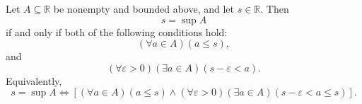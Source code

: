 \begin{definition}
\label{def:epsilon-characterization-of-supremum}
Let $A\subseteq\mathbb{R}$ be nonempty and bounded above, and let
$s\in\mathbb{R}$. Then
\[
  s=\sup A
\]
if and only if both of the following conditions hold:
\[
  (\forall a\in A)(a\leq s),
\]
and
\[
  (\forall\varepsilon>0)(\exists a\in A)(s-\varepsilon<a).
\]
Equivalently,
\[
  s=\sup A
  \Longleftrightarrow
  \left[
    (\forall a\in A)(a\leq s)
    \land
    (\forall\varepsilon>0)(\exists a\in A)(s-\varepsilon<a\leq s)
  \right].
\]
\end{definition}